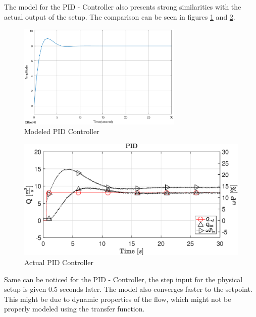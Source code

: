 The model for the PID - Controller also presents strong similarities with the actual output of the setup.
The comparison can be seen in figures \ref{fig:modeledPID2} and \ref{fig:actualPID2}.
\begin{figure}[H]
	\centering
	\includegraphics[width=0.7\textwidth]{figures/06ModelValidation/modelPID.eps}
	\caption{Modeled PID Controller}
	\label{fig:modeledPID2}
\end{figure}
\vspace{-5mm}
\begin{figure}[H]
    \centering
    \includegraphics[width=\textwidth]{figures/07controllerDesign/PIDtest.eps}
    \caption{Actual PID Controller}
	\label{fig:actualPID2}
\end{figure}
Same can be noticed for the PID - Controller, the step input for the physical setup is given 0.5 seconds later.
The model also converges faster to the setpoint. This might be due to dynamic properties of the flow, which might 
not be properly modeled using the transfer function.